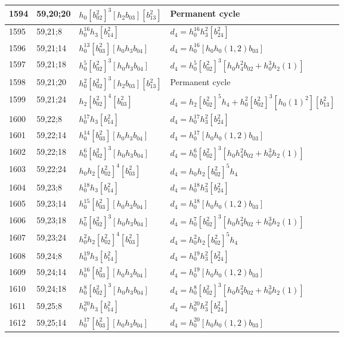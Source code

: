 \documentclass{article}
\begin{document}
\begin{longtable}{|l|l|>{\raggedright\arraybackslash}p{6cm}|>{\raggedright\arraybackslash}p{6cm}|}
\hline
1594 & 59,20;20 & $h_0[b_{02}^2]^3[h_2b_{03}][b_{13}^2]$ & Permanent cycle\\
\hline
1595 & 59,21;8 & $h_0^{16}h_3[b_{14}^2]$ &$d_{4}=h_0^{16}h_3^2[b_{24}^2]$\\
\hline
1596 & 59,21;14 & $h_0^{13}[b_{03}^2][h_0h_3b_{04}]$ &$d_{4}=h_0^{16}[h_0h_0(1, 2)b_{03}]$\\
\hline
1597 & 59,21;18 & $h_0^5[b_{02}^2]^3[h_0h_3b_{04}]$ &$d_{4}=h_0^5[b_{02}^2]^3[h_0h_4^2b_{02} + h_0^3h_2(1)]$\\
\hline
1598 & 59,21;20 & $h_0^2[b_{02}^2]^3[h_2b_{03}][b_{13}^2]$ & Permanent cycle\\
\hline
1599 & 59,21;24 & $h_2[b_{02}^2]^4[b_{03}^2]$ &$d_{4}=h_2[b_{02}^2]^5h_4 + h_0^2[b_{02}^2]^3[h_0(1)^2][b_{13}^2]$\\
\hline
1600 & 59,22;8 & $h_0^{17}h_3[b_{14}^2]$ &$d_{4}=h_0^{17}h_3^2[b_{24}^2]$\\
\hline
1601 & 59,22;14 & $h_0^{14}[b_{03}^2][h_0h_3b_{04}]$ &$d_{4}=h_0^{17}[h_0h_0(1, 2)b_{03}]$\\
\hline
1602 & 59,22;18 & $h_0^6[b_{02}^2]^3[h_0h_3b_{04}]$ &$d_{4}=h_0^6[b_{02}^2]^3[h_0h_4^2b_{02} + h_0^3h_2(1)]$\\
\hline
1603 & 59,22;24 & $h_0h_2[b_{02}^2]^4[b_{03}^2]$ &$d_{4}=h_0h_2[b_{02}^2]^5h_4$\\
\hline
1604 & 59,23;8 & $h_0^{18}h_3[b_{14}^2]$ &$d_{4}=h_0^{18}h_3^2[b_{24}^2]$\\
\hline
1605 & 59,23;14 & $h_0^{15}[b_{03}^2][h_0h_3b_{04}]$ &$d_{4}=h_0^{18}[h_0h_0(1, 2)b_{03}]$\\
\hline
1606 & 59,23;18 & $h_0^7[b_{02}^2]^3[h_0h_3b_{04}]$ &$d_{4}=h_0^7[b_{02}^2]^3[h_0h_4^2b_{02} + h_0^3h_2(1)]$\\
\hline
1607 & 59,23;24 & $h_0^2h_2[b_{02}^2]^4[b_{03}^2]$ &$d_{4}=h_0^2h_2[b_{02}^2]^5h_4$\\
\hline
1608 & 59,24;8 & $h_0^{19}h_3[b_{14}^2]$ &$d_{4}=h_0^{19}h_3^2[b_{24}^2]$\\
\hline
1609 & 59,24;14 & $h_0^{16}[b_{03}^2][h_0h_3b_{04}]$ &$d_{4}=h_0^{19}[h_0h_0(1, 2)b_{03}]$\\
\hline
1610 & 59,24;18 & $h_0^8[b_{02}^2]^3[h_0h_3b_{04}]$ &$d_{4}=h_0^8[b_{02}^2]^3[h_0h_4^2b_{02} + h_0^3h_2(1)]$\\
\hline
1611 & 59,25;8 & $h_0^{20}h_3[b_{14}^2]$ &$d_{4}=h_0^{20}h_3^2[b_{24}^2]$\\
\hline
1612 & 59,25;14 & $h_0^{17}[b_{03}^2][h_0h_3b_{04}]$ &$d_{4}=h_0^{20}[h_0h_0(1, 2)b_{03}]$\\

\end{longtable}
\end{document}
